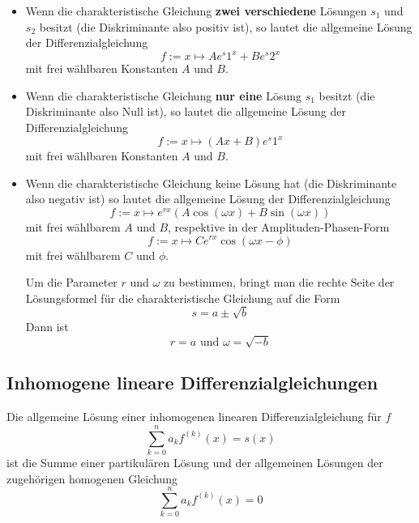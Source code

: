 \documentclass[10pt,a4paper]{scrartcl}
\begin{document}
\begin{itemize}

\item Wenn die charakteristische Gleichung \textbf{zwei verschiedene} Lösungen
$s_1$ und $s_2$ besitzt (die Diskriminante also positiv ist), so lautet die
allgemeine Lösung der Differenzialgleichung
$$f := x \mapsto Ae^s1^x + Be^s2^x$$
mit frei wählbaren Konstanten $A$ und $B$.

\item Wenn die charakteristische Gleichung \textbf{nur eine} Lösung $s_1$ besitzt
(die Diskriminante also Null ist), so lautet die allgemeine Lösung der Differenzialgleichung
$$f := x \mapsto (Ax + B)e^s1^x$$
mit frei wählbaren Konstanten $A$ und $B$.

\item Wenn die charakteristische Gleichung keine Lösung hat (die Diskriminante
also negativ ist) so lautet die allgemeine Lösung der Differenzialgleichung
$$f := x \mapsto e^{rx}\left(A \cos(\omega x) + B \sin(\omega x)\right)$$
mit frei wählbarem $A$ und $B$, respektive in der Amplituden-Phasen-Form
$$f := x \mapsto Ce^{rx} \cos(\omega x - \phi)$$
mit frei wählbarem $C$ und $\phi$.

Um die Parameter $r$ und $\omega$ zu bestimmen, bringt man die rechte Seite der
Lösungsformel für die charakteristische Gleichung auf die Form
$$s = a \pm \sqrt{b}$$
Dann ist
$$r = a \textrm{ und } \omega = \sqrt{-b}$$
\end{itemize}


\subsection{Inhomogene lineare Differenzialgleichungen}

Die allgemeine Lösung einer inhomogenen linearen Differenzialgleichung für $f$
$$\sum_{k=0}^n a_k f^{(k)}(x) = s(x)$$
ist die Summe einer partikulären Lösung und der allgemeinen Lösungen
der zugehörigen homogenen Gleichung
$$\sum_{k=0}^n a_k f^{(k)}(x) = 0$$
\end{document}
